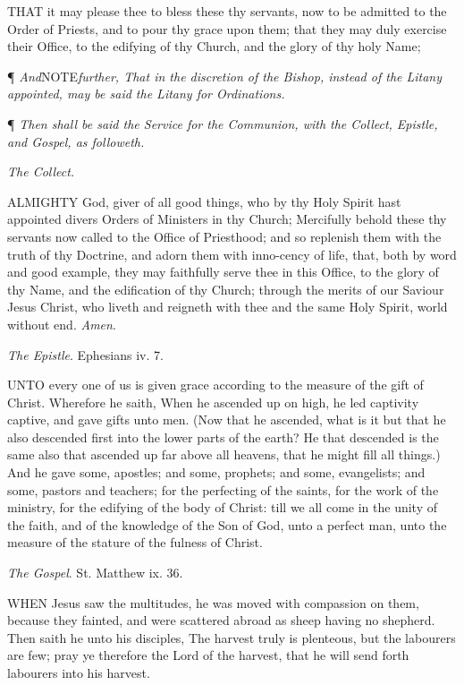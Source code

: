 THAT
it may please thee to bless these thy servants, now to be admitted to
the Order of Priests, and to pour thy grace upon them; that they may
duly exercise their Office, to the edifying of thy Church, and the glory
of thy holy Name;

¶
\emph{And}NOTE\emph{further, That in the discretion
of the Bishop, instead of the Litany appointed, may be said the Litany
for Ordinations.}

¶ \emph{Then shall be said the Service for the Communion, with the
Collect, Epistle, and Gospel, as followeth.}

\emph{The
Collect.}

ALMIGHTY
God, giver of all good things, who by thy Holy Spirit hast appointed divers
Orders of Ministers in thy Church; Mercifully behold these thy servants
now called to the Office of Priesthood; and so replenish them with the
truth of thy Doctrine, and adorn them with inno-cency of life, that, both
by word and good example, they may faithfully serve thee in this Office,
to the glory of thy Name, and the edification of thy Church; through the
merits of our Saviour Jesus Christ, who liveth and reigneth with thee
and the same Holy Spirit, world without end. \emph{Amen}. 

\emph{The
Epist}\emph{le}.
Ephesians iv. 7.

UNTO
every one of us is given grace according to the measure of the gift
of Christ. Wherefore he saith, When he ascended up on high, he led captivity
captive, and gave gifts unto men. (Now that he ascended, what is it
but that he also descended first into the lower parts of the earth?
He that descended is the same also that ascended up far above all heavens,
that he might fill all things.) And he gave some, apostles; and some,
prophets; and some, evangelists; and some, pastors and teachers; for
the perfecting of the saints, for the work of the ministry, for the
edifying of the body of Christ: till we all come in the unity of the
faith, and of the knowledge of the Son of God, unto a perfect man, unto
the measure of the stature of the fulness of Christ.

\emph{The Gospel}. St. Matthew ix. 36.

WHEN Jesus saw the multitudes,
he was moved with compassion on them, because they fainted, and were scattered
abroad as sheep having no shepherd. Then saith he unto his disciples,
The harvest truly is plenteous, but the labourers are few; pray ye therefore
the Lord of the harvest, that he will send forth labourers into his harvest.

